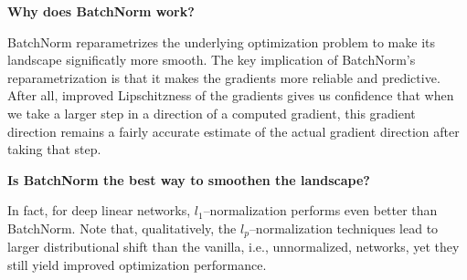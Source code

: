 \textbf{Why does BatchNorm work?}


BatchNorm reparametrizes the underlying optimization problem to make its landscape significatly more smooth.
The key implication of BatchNorm's reparametrization is that it makes the gradients more reliable and predictive.
After all, improved Lipschitzness of the gradients gives us confidence that when we take a larger step in a direction 
of a computed gradient, this gradient direction remains a fairly accurate estimate of the actual gradient direction after 
taking that step.

\textbf{Is BatchNorm the best way to smoothen the landscape?}

In fact, for deep linear networks, $l_1$–normalization performs even better than BatchNorm. Note that, 
qualitatively, the $l_p$–normalization techniques lead to larger distributional shift than the vanilla,
 i.e., unnormalized, networks, yet they still yield improved optimization performance.